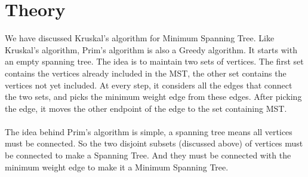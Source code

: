\documentclass[11pt]{article}            %
\begin{document}
\section{Theory }              
\justify We have discussed Kruskal’s algorithm for Minimum Spanning Tree. Like Kruskal’s algorithm, Prim’s algorithm is also a Greedy algorithm. It starts with an empty spanning tree. The idea is to maintain two sets of vertices. The first set contains the vertices already included in the MST, the other set contains the vertices not yet included. At every step, it considers all the edges that connect the two sets, and picks the minimum weight edge from these edges. After picking the edge, it moves the other endpoint of the edge to the set containing MST.\\~\\The idea behind Prim’s algorithm is simple, a spanning tree means all vertices must be connected. So the two disjoint subsets (discussed above) of vertices must be connected to make a Spanning Tree. And they must be connected with the minimum weight edge to make it a Minimum Spanning Tree.\\~\\
\end{document}
